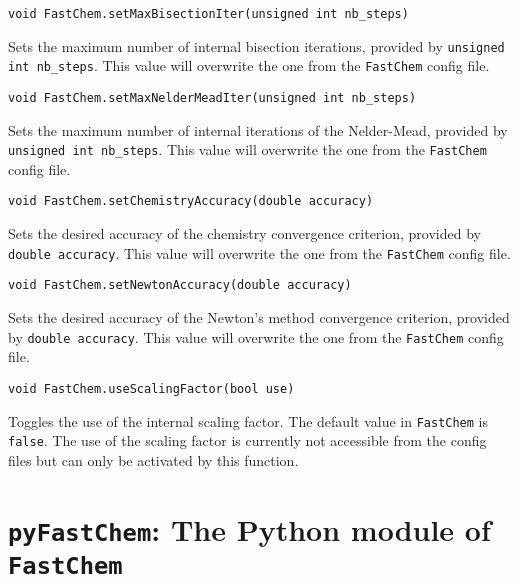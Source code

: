 \documentclass[numbers=noenddot]{fcmanual}
\newcommand{\fc}{\texttt{FastChem}\xspace}
\newcommand{\pfc}{\texttt{pyFastChem}\xspace}
\begin{document}
\bigbreak

\lstinline!void FastChem.setMaxBisectionIter(unsigned int nb_steps)!
\begin{addmargin}[25pt]{0pt}
  Sets the maximum number of internal bisection iterations, provided by \lstinline!unsigned int nb_steps!. This value will overwrite the one from the \fc config file.
\end{addmargin}

\bigbreak

\lstinline!void FastChem.setMaxNelderMeadIter(unsigned int nb_steps)!
\begin{addmargin}[25pt]{0pt}
  Sets the maximum number of internal iterations of the Nelder-Mead, provided by \lstinline!unsigned int nb_steps!. This value will overwrite the one from the \fc config file.
\end{addmargin}

\bigbreak

\lstinline!void FastChem.setChemistryAccuracy(double accuracy)!
\begin{addmargin}[25pt]{0pt}
  Sets the desired accuracy of the chemistry convergence criterion, provided by \lstinline!double accuracy!. This value will overwrite the one from the \fc config file.
\end{addmargin}

\bigbreak

\lstinline!void FastChem.setNewtonAccuracy(double accuracy)!
\begin{addmargin}[25pt]{0pt}
  Sets the desired accuracy of the Newton's method convergence criterion, provided by \lstinline!double accuracy!. This value will overwrite the one from the \fc config file.
\end{addmargin}

\bigbreak

\lstinline!void FastChem.useScalingFactor(bool use)!
\begin{addmargin}[25pt]{0pt}
  Toggles the use of the internal scaling factor. The default value in \fc is \lstinline!false!. The use of the scaling factor is currently not accessible from the config files but can only be activated by this function.
\end{addmargin}



\chapter{\pfc: The Python module of \fc}
\label{sec:pyfc_details}
\end{document}
